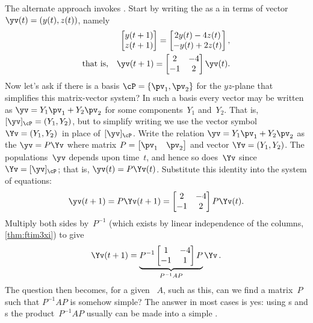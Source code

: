The alternate approach invokes .
Start by writing the  as a  in terms of vector \(\yv(t)=(y(t),z(t))\), namely
\begin{eqnarray*}&&
\begin{bmatrix} y(t+1)\\z(t+1) \end{bmatrix}
=\begin{bmatrix} 2y(t)-4z(t)\\-y(t)+2z(t) \end{bmatrix}
,\\\text{that is,}&&
\yv(t+1)=\begin{bmatrix} 2&-4\\-1&2 \end{bmatrix}\yv(t).
\end{eqnarray*}
Now let's ask if there is a basis \(\cP=\{\pv_1,\pv_2\}\) for the \(yz\)-plane that simplifies this matrix-vector system?
In such a basis every vector may be written as \(\yv=Y_1\pv_1+Y_2\pv_2\) for some components~\(Y_1\) and~\(Y_2\).
That is,  \([\yv]_\cP=(Y_1,Y_2)\),
but to simplify writing we use the vector symbol~\(\Yv=(Y_1,Y_2)\)\ in place of~\([\yv]_\cP\).
Write the relation \(\yv=Y_1\pv_1+Y_2\pv_2\) as the  \(\yv=P\Yv\) where matrix \(P=\begin{bmatrix} \pv_1&\pv_2 \end{bmatrix}\) and vector \(\Yv=(Y_1,Y_2)\).
The populations~\(\yv\) depends upon time~\(t\), and hence so does~\(\Yv\) since \(\Yv=[\yv]_\cP\); that is, \(\yv(t)=P\Yv(t)\).
Substitute this identity into the system of equations:
\begin{equation*}
\yv(t+1)=P\Yv(t+1)=\begin{bmatrix} 2&-4\\-1&2 \end{bmatrix}P\Yv(t).
\end{equation*}
Multiply both sides by~\(P^{-1}\) (which exists by linear independence of the columns, \autoref{thm:ftim3xi}) to give
\begin{equation*}
\Yv(t+1)=\underbrace{P^{-1}\begin{bmatrix} 1&-4\\-1&1 \end{bmatrix}P}_{P^{-1}AP}\Yv\,.
\end{equation*}
The question then becomes, for a given ~\(A\), such as this, can we find a matrix~\(P\) such that \(P^{-1}AP\) is somehow simple?
The answer in most cases is yes: using s and s the product~\(P^{-1}AP\) usually can be made into a simple .




